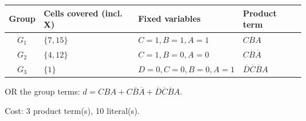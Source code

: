 \documentclass[a4paper,11pt]{article}
\begin{document}
\begin{minipage}{\textwidth}
\begin{center}\small
\begin{tabular}{clll}
\toprule
Group & Cells covered (incl. X) & Fixed variables & Product term\\\midrule
\textcolor{blue!75!black}{$G_{1}$} & $\{7,15\}$ & $C=1,B=1,A=1$ & $CBA$\\
\textcolor{red!75!black}{$G_{2}$} & $\{4,12\}$ & $C=1,B=0,A=0$ & $C\overline{B}\overline{A}$\\
\textcolor{teal!80!black}{$G_{3}$} & $\{1\}$ & $D=0,C=0,B=0,A=1$ & $\overline{D}\overline{C}\overline{B}A$\\
\bottomrule\end{tabular}\end{center}


\noindent OR the group terms: $\boxed{d=CBA + C\overline{B}\overline{A} + \overline{D}\overline{C}\overline{B}A}$.

\noindent Cost: 3 product term(s), 10 literal(s).

\end{minipage}\par\vspace{0.25cm}

\clearpage
\end{document}
